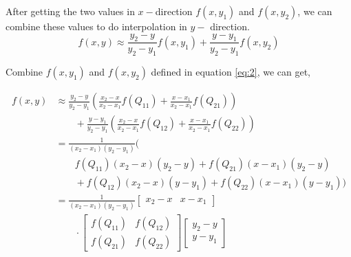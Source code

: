     After getting the two values in $x-$direction $f(x, y_1)$ and $f(x, y_2)$, we can combine these values to do interpolation in $y-$ direction.
    \begin{equation}
        f(x,y) \approx {\frac {y_{2}-y}{y_{2}-y_{1}}}f(x,y_{1})+{\frac {y-y_{1}}{y_{2}-y_{1}}}f(x,y_{2})
    \end{equation}

    Combine $f(x, y_1)$ and $f(x, y_2)$ defined in equation \ref{eq:2}, we can get,

    \begin{equation}
        \begin{aligned}
        f(x,y)&\approx{\frac {y_{2}-y}{y_{2}-y_{1}}}\left({\frac {x_{2}-x}{x_{2}-x_{1}}}f(Q_{11})+{\frac {x-x_{1}}{x_{2}-x_{1}}}f(Q_{21})\right)\\&\qquad+{\frac {y-y_{1}}{y_{2}-y_{1}}}\left({\frac {x_{2}-x}{x_{2}-x_{1}}}f(Q_{12})+{\frac {x-x_{1}}{x_{2}-x_{1}}}f(Q_{22})\right)\\&={\frac {1}{(x_{2}-x_{1})(y_{2}-y_{1})}}{\big (}\\&\qquad f(Q_{11})(x_{2}-x)(y_{2}-y)+f(Q_{21})(x-x_{1})(y_{2}-y)\\&\qquad+f(Q_{12})(x_{2}-x)(y-y_{1})+f(Q_{22})(x-x_{1})(y-y_{1}){\big )}\\&={\frac {1}{(x_{2}-x_{1})(y_{2}-y_{1})}}{\begin{bmatrix}x_{2}-x&x-x_{1}\end{bmatrix}}\\&\qquad \cdot {\begin{bmatrix}f(Q_{11})&f(Q_{12})\\f(Q_{21})&f(Q_{22})\end{bmatrix}}{\begin{bmatrix}y_{2}-y\\y-y_{1}\end{bmatrix}}
        \end{aligned}
        \label{interpolation}
    \end{equation}


